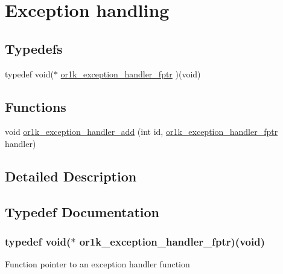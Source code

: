 \hypertarget{group__or1k__exception}{\section{Exception handling}
\label{group__or1k__exception}
}
\subsection*{Typedefs}
\begin{DoxyCompactItemize}
\item 
typedef void($\ast$ \hyperlink{group__or1k__exception_ga20831301797ab759efddfc215a260b8a}{or1k\-\_\-exception\-\_\-handler\-\_\-fptr} )(void)
\end{DoxyCompactItemize}
\subsection*{Functions}
\begin{DoxyCompactItemize}
\item 
void \hyperlink{group__or1k__exception_gac3e0470bbc623a950c46650a0dc734e6}{or1k\-\_\-exception\-\_\-handler\-\_\-add} (int id, \hyperlink{group__or1k__exception_ga20831301797ab759efddfc215a260b8a}{or1k\-\_\-exception\-\_\-handler\-\_\-fptr} handler)
\end{DoxyCompactItemize}


\subsection{Detailed Description}


\subsection{Typedef Documentation}
\hypertarget{group__or1k__exception_ga20831301797ab759efddfc215a260b8a}{
\subsubsection[{or1k\-\_\-exception\-\_\-handler\-\_\-fptr}]{\setlength{\rightskip}{0pt plus 5cm}typedef void($\ast$ or1k\-\_\-exception\-\_\-handler\-\_\-fptr)(void)}}\label{group__or1k__exception_ga20831301797ab759efddfc215a260b8a}
Function pointer to an exception handler function 

